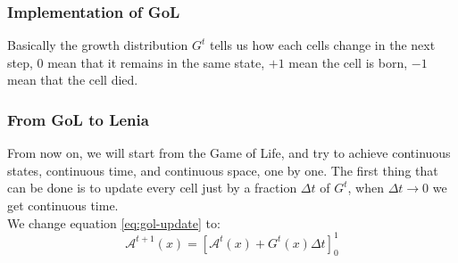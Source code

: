 \documentclass{beamer}
\begin{document}
\begin{frame}
  \frametitle{Implementation of GoL}
  Basically the growth distribution $G^t$ tells us how each cells change in the next step, $0$ mean that it remains in the same state, $+1$ mean the cell is born, $-1$ mean that the cell died.
\end{frame}

\begin{frame}
  \frametitle{From GoL to Lenia}
  From now on, we will start from the Game of Life, and try to achieve
  continuous states, continuous time, and continuous space, one by one.
  The first thing that can be done is to update every cell just by a fraction
  $\Delta t$ of $G^t$, when $\Delta t \rightarrow 0$ we get continuous time.\\
  We change equation \ref{eq:gol-update} to:
  \begin{equation}\label{eq:gol-update-dt}
    \mathcal{A}^{t+1}(x) = [\mathcal{A}^t(x) + G^{t}(x)\Delta t]^1_0
  \end{equation}
\end{frame}
\end{document}
